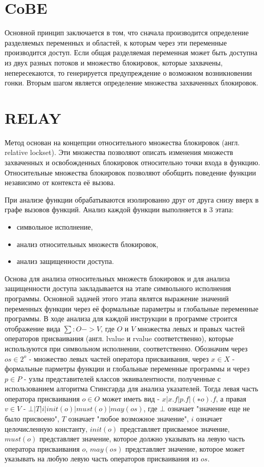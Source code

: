 \section{CoBE}

Основной принцип заключается в том, что сначала производится определение разделяемых переменных и областей, к которым через эти переменные производится доступ. Если общая разделяемая переменная может быть доступна из двух разных потоков и множество блокировок, которые захвачены, непересекаются, то генерируется предупреждение о возможном возникновении гонки. Вторым шагом является определение множества захваченных блокировок.

\section{RELAY}

Метод основан на концепции относительного множества блокировок (англ. relative lockset). Эти множества позволяют описать изменения множеств захваченных и освобожденных блокировок относительно точки входа в функцию. Относительные множества блокировок позволяют обобщить поведение функции независимо от контекста её вызова.

При анализе функции обрабатываются изолированно друг от друга снизу вверх в графе вызовов функций. Анализ каждой функции выполняется в 3 этапа:
\begin{itemize}
\item символьное исполнение,
\item анализ относительных множеств блокировок,
\item анализ защищенности доступа.
\end{itemize}

Основа для анализа относительных множеств блокировок и для анализа защищенности доступа закладывается на этапе символьного исполнения программы. Основной задачей этого этапа являтся выражение значений переменных функции через её формальные параметры и глобальные переменные программы. В ходе анализа для каждой инструкции в программе строится отображение вида $\sum: O->V$, где $O$ и $V$ множества левых и правых частей операторов присваивания (англ. lvalue и rvalue соответственно), которые используются при символьном исполнении, соответственно. Обозначим через $os \in 2^{o}$ - множество левых частей оператора присваивания, через $x \in X$ - формальные парметры функции и глобальные переменные программы и через $p \in P$ - узлы представителей классов эквивалентности, полученные с использованием алгоритма Стинсгарда для анализа указателей. Тогда левая часть оператора присваивания $o \in O$ может иметь вид - $x | x.f | p.f | (∗o).f$, а правая $v \in V$ - $⊥ | T | i | init(o) | must(o) | may(os)$, где $⊥$ означает "значение еще не было присвоено", $T$ означает "любое возможное значение", $i$ означает целочисленную константу, $init(o)$ представляет присваемое значение, $must(o)$ представляет значение, которое должно указывать на левую часть оператора присваивания $o$, $may(os)$ представляет значение, которое может указывать на любую левую часть операторов присваивания из $os$.

